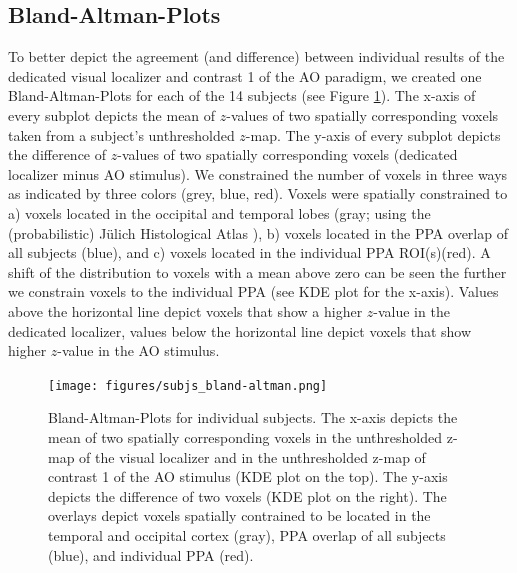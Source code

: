 \documentclass[english]{article}
\begin{document}
\subsection{Bland-Altman-Plots}


To better depict the agreement (and difference) between individual results of
the dedicated visual localizer and contrast 1 of the AO paradigm, we created one
Bland-Altman-Plots for each of the 14 subjects (see Figure
\ref{fig:bland-altman}).
The x-axis of every subplot depicts the mean of $z$-values of two spatially
corresponding voxels taken from a subject's unthresholded $z$-map.
The y-axis of every subplot depicts the difference of $z$-values of two
spatially corresponding voxels (dedicated localizer minus AO stimulus).
We constrained the number of voxels in three ways as indicated by three colors
(grey, blue, red).
Voxels were spatially constrained to a) voxels located in the occipital and
temporal lobes (gray; using the (probabilistic) Jülich Histological Atlas
\citep{eickhoff2005toolbox, eickhoff2007assignment}), b) voxels located in the
PPA overlap of all subjects (blue), and c) voxels located in the individual PPA
ROI(s)(red).
A shift of the distribution to voxels with a mean above zero can be seen the
further we constrain voxels to the individual PPA (see KDE plot for the x-axis).
Values above the horizontal line depict voxels that show a higher $z$-value in
the dedicated localizer, values below the horizontal line depict voxels that
show higher $z$-value in the AO stimulus.


\begin{figure} \centering
    \texttt{[image: figures/subjs\_bland-altman.png]}
    \caption{Bland-Altman-Plots for individual subjects. The x-axis depicts the
        mean of two spatially corresponding voxels in the unthresholded z-map of
        the visual localizer and in the unthresholded z-map of contrast 1 of the
        AO stimulus (KDE plot on the top). The y-axis depicts the difference of
        two voxels (KDE plot on the right). The overlays depict voxels spatially
        contrained to be located in the temporal and occipital cortex (gray),
    PPA overlap of all subjects (blue), and individual PPA (red).}
    \label{fig:bland-altman} \end{figure}
\end{document}
